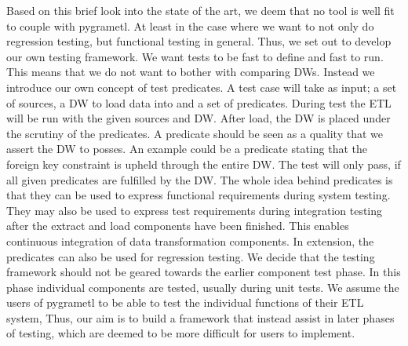 Based on this brief look into the state of the art, we deem that no tool is well fit to couple with pygrametl. At least in the case where we want to not only do regression testing, but functional testing in general. Thus, we set out to develop our own testing framework. We want tests to be fast to define and fast to run. This means that we do not want to bother with comparing DWs. Instead we introduce our own concept of test predicates. A test case will take as input; a set of sources, a DW to load data into and a set of predicates. During test the ETL will be run with the given sources and DW. After load, the DW  is placed under the scrutiny of the predicates. A predicate should be seen as a quality that we assert the DW to posses. An example could be a predicate stating that the foreign key constraint is upheld through the entire DW. The test will only pass, if all given predicates are fulfilled by the DW. The whole idea behind predicates is that they can be used to express functional requirements during system testing. They may also be used to express test requirements during integration testing after the extract and load components have been finished. This enables continuous integration of data transformation components. In extension, the predicates can also be used for regression testing. We decide that the testing framework should not be geared towards the earlier component test phase. In this phase individual components are tested, usually during unit tests. We assume the users of pygrametl to be able to test the individual functions of their ETL system, Thus, our aim is to build a framework that instead assist in later phases of testing, which are deemed to be more difficult for users to implement. 


